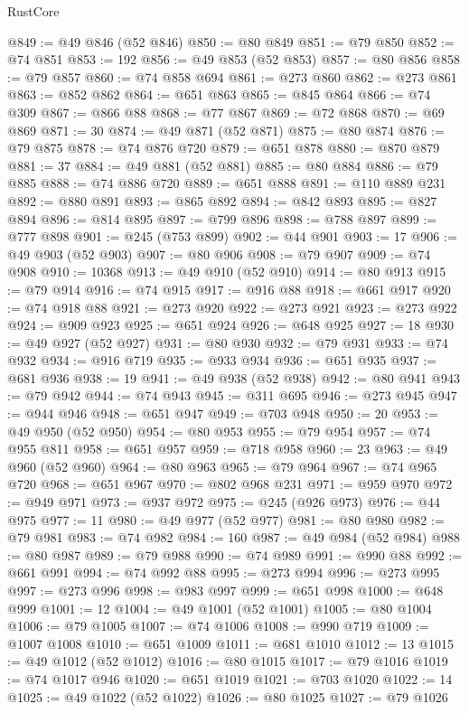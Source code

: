 \begin{lexlean}{RustCore}
\begin{coremodule}
@849 := @49 @846 (@52 @846)
@850 := @80 @849
@851 := @79 @850
@852 := @74 @851
@853 := 192
@856 := @49 @853 (@52 @853)
@857 := @80 @856
@858 := @79 @857
@860 := @74 @858 @694
@861 := @273 @860
@862 := @273 @861
@863 := @852 @862
@864 := @651 @863
@865 := @845 @864
@866 := @74 @309
@867 := @866 @88
@868 := @77 @867
@869 := @72 @868
@870 := @69 @869
@871 := 30
@874 := @49 @871 (@52 @871)
@875 := @80 @874
@876 := @79 @875
@878 := @74 @876 @720
@879 := @651 @878
@880 := @870 @879
@881 := 37
@884 := @49 @881 (@52 @881)
@885 := @80 @884
@886 := @79 @885
@888 := @74 @886 @720
@889 := @651 @888
@891 := @110 @889 @231
@892 := @880 @891
@893 := @865 @892
@894 := @842 @893
@895 := @827 @894
@896 := @814 @895
@897 := @799 @896
@898 := @788 @897
@899 := @777 @898
@901 := @245 (@753 @899)
@902 := @44 @901
@903 := 17
@906 := @49 @903 (@52 @903)
@907 := @80 @906
@908 := @79 @907
@909 := @74 @908
@910 := 10368
@913 := @49 @910 (@52 @910)
@914 := @80 @913
@915 := @79 @914
@916 := @74 @915
@917 := @916 @88
@918 := @661 @917
@920 := @74 @918 @88
@921 := @273 @920
@922 := @273 @921
@923 := @273 @922
@924 := @909 @923
@925 := @651 @924
@926 := @648 @925
@927 := 18
@930 := @49 @927 (@52 @927)
@931 := @80 @930
@932 := @79 @931
@933 := @74 @932
@934 := @916 @719
@935 := @933 @934
@936 := @651 @935
@937 := @681 @936
@938 := 19
@941 := @49 @938 (@52 @938)
@942 := @80 @941
@943 := @79 @942
@944 := @74 @943
@945 := @311 @695
@946 := @273 @945
@947 := @944 @946
@948 := @651 @947
@949 := @703 @948
@950 := 20
@953 := @49 @950 (@52 @950)
@954 := @80 @953
@955 := @79 @954
@957 := @74 @955 @811
@958 := @651 @957
@959 := @718 @958
@960 := 23
@963 := @49 @960 (@52 @960)
@964 := @80 @963
@965 := @79 @964
@967 := @74 @965 @720
@968 := @651 @967
@970 := @802 @968 @231
@971 := @959 @970
@972 := @949 @971
@973 := @937 @972
@975 := @245 (@926 @973)
@976 := @44 @975
@977 := 11
@980 := @49 @977 (@52 @977)
@981 := @80 @980
@982 := @79 @981
@983 := @74 @982
@984 := 160
@987 := @49 @984 (@52 @984)
@988 := @80 @987
@989 := @79 @988
@990 := @74 @989
@991 := @990 @88
@992 := @661 @991
@994 := @74 @992 @88
@995 := @273 @994
@996 := @273 @995
@997 := @273 @996
@998 := @983 @997
@999 := @651 @998
@1000 := @648 @999
@1001 := 12
@1004 := @49 @1001 (@52 @1001)
@1005 := @80 @1004
@1006 := @79 @1005
@1007 := @74 @1006
@1008 := @990 @719
@1009 := @1007 @1008
@1010 := @651 @1009
@1011 := @681 @1010
@1012 := 13
@1015 := @49 @1012 (@52 @1012)
@1016 := @80 @1015
@1017 := @79 @1016
@1019 := @74 @1017 @946
@1020 := @651 @1019
@1021 := @703 @1020
@1022 := 14
@1025 := @49 @1022 (@52 @1022)
@1026 := @80 @1025
@1027 := @79 @1026

\end{coremodule}
\end{lexlean}
